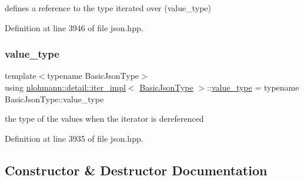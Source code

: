defines a reference to the type iterated over (value\+\_\+type) 



Definition at line 3946 of file json.\+hpp.

\mbox{\label{classnlohmann_1_1detail_1_1iter__impl_ab35586a44f2222272c5346baa3013f67}} 
\subsubsection{\texorpdfstring{value\+\_\+type}{value\_type}}
{\footnotesize\ttfamily template$<$typename Basic\+Json\+Type$>$ \\
using \hyperlink{classnlohmann_1_1detail_1_1iter__impl}{nlohmann\+::detail\+::iter\+\_\+impl}$<$ \hyperlink{classnlohmann_1_1detail_1_1iter__impl_abf18f18793f84b0222aebb5a2a87da7a}{Basic\+Json\+Type} $>$\+::\hyperlink{classnlohmann_1_1detail_1_1iter__impl_ab35586a44f2222272c5346baa3013f67}{value\+\_\+type} =  typename Basic\+Json\+Type\+::value\+\_\+type}



the type of the values when the iterator is dereferenced 



Definition at line 3935 of file json.\+hpp.



\subsection{Constructor \& Destructor Documentation}
\mbox{\label{classnlohmann_1_1detail_1_1iter__impl_a19aa457f9c4af1b7e3af59839132cc5c}} 
